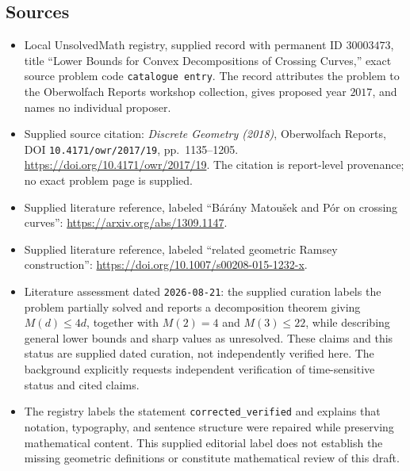 \documentclass[11pt]{article}
\begin{document}
\subsection{Sources}
\begin{itemize}
\item Local UnsolvedMath registry, supplied record with permanent ID \(30003473\), title ``Lower Bounds for Convex Decompositions of Crossing Curves,'' exact source problem code \texttt{catalogue entry}. The record attributes the problem to the Oberwolfach Reports workshop collection, gives proposed year \(2017\), and names no individual proposer.
\item Supplied source citation: \emph{Discrete Geometry (2018)}, Oberwolfach Reports, DOI \texttt{10.4171/owr/2017/19}, pp.\ 1135--1205. \url{https://doi.org/10.4171/owr/2017/19}. The citation is report-level provenance; no exact problem page is supplied.
\item Supplied literature reference, labeled ``Bárány Matoušek and Pór on crossing curves'': \url{https://arxiv.org/abs/1309.1147}.
\item Supplied literature reference, labeled ``related geometric Ramsey construction'': \url{https://doi.org/10.1007/s00208-015-1232-x}.
\item Literature assessment dated \texttt{2026-08-21}: the supplied curation labels the problem partially solved and reports a decomposition theorem giving \(M(d)\leq4d\), together with \(M(2)=4\) and \(M(3)\leq22\), while describing general lower bounds and sharp values as unresolved. These claims and this status are supplied dated curation, not independently verified here. The background explicitly requests independent verification of time-sensitive status and cited claims.
\item The registry labels the statement \texttt{corrected\_verified} and explains that notation, typography, and sentence structure were repaired while preserving mathematical content. This supplied editorial label does not establish the missing geometric definitions or constitute mathematical review of this draft.
\end{itemize}
\end{document}
